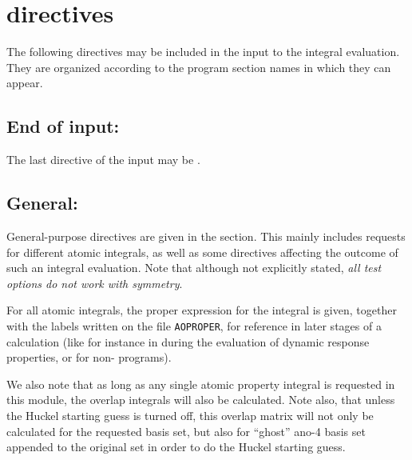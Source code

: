 \section{ directives}\label{sec:herinp}

          The following directives may be included in the input to
the integral evaluation.  They are organized according to the program
section names in which they can appear.

\subsection{End of input: }

The last directive of the  input may be .

\subsection{General: }



General-purpose directives are given in the 
section. This mainly includes requests for different atomic integrals,
as well as some
directives affecting the outcome of such an integral evaluation. Note
that although not explicitly stated, {\em all test options do not
work with symmetry}.

For all atomic integrals, the proper expression for the integral is
given, together with the labels written on the file
\texttt{AOPROPER}, for
reference in later stages of a {\dalton} calculation (like for instance
in during the evaluation of dynamic response properties, or for
non-{\dalton} programs).

We also note that as long as any single atomic property
integral is
requested in this module, the overlap integrals will also be
calculated. Note also, that unless the Huckel starting guess is turned
off, this overlap matrix will not only be calculated for the requested
basis set, but also for ``ghost'' ano-4 basis set appended to the
original set in order to do the Huckel starting guess.

